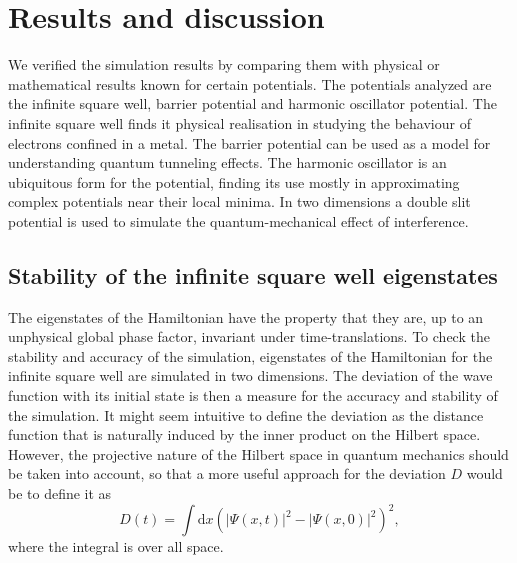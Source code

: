 \section*{Results and discussion}
We verified the simulation results by comparing them with physical or mathematical results known for certain potentials. The potentials analyzed are the infinite square well, barrier potential and harmonic oscillator potential.
The infinite square well finds it physical realisation in studying the behaviour of electrons confined in a metal. The barrier potential can be used as a model for understanding quantum tunneling effects. The harmonic oscillator is an ubiquitous form for the potential, finding its use mostly in approximating complex potentials near their local minima.
In two dimensions a double slit potential is used to simulate the quantum-mechanical effect of interference.


\subsection*{Stability of the infinite square well eigenstates}
The eigenstates of the Hamiltonian have the property that they are, up to an unphysical global phase factor, invariant under time-translations. To check the stability and accuracy of the simulation, eigenstates of the Hamiltonian for the infinite square well are simulated in two dimensions. The deviation of the wave function with its initial state is then a measure for the accuracy and stability of the simulation. It might seem intuitive to define the deviation as the distance function that is naturally induced by the inner product on the Hilbert space. However, the projective nature of the Hilbert space in quantum mechanics should be taken into account, so that a more useful approach for the deviation $D$ would be to define it as
\[
D(t) = \int\mathrm{d}x\left(|\Psi(x,t)|^2-|\Psi(x,0)|^2\right)^2,
\] where the integral is over all space.

